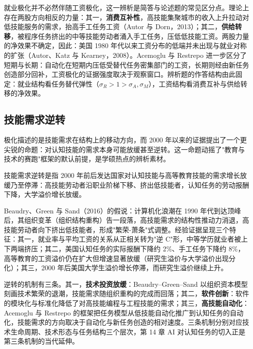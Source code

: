 就业极化并不必然伴随工资极化，这一辨析是简答与论述题的常见区分点。理论上存在两股方向相反的力量：其一，\textbf{消费互补性}，高技能集聚城市的收入上升拉动对低技能服务的需求，抬高手工任务工资（Autor 与 Dorn，2013）；其二，\textbf{供给转移}，被程序任务挤出的中等技能劳动者涌入手工任务，压低低技能工资。两股力量的净效果不确定，因此：美国 1980 年代以来工资分布的低端并未出现与就业对称的扩张（Autor、Katz 与 Kearney，2008）。Acemoglu 与 Restrepo 进一步区分了短期与长期：自动化在短期内压低受替代任务密集部门的工资，长期则经由新任务创造部分回补，工资极化的证据强度取决于观察窗口。辨析题的作答结构由此固定：就业结构看任务替代弹性（$\sigma_R > 1 > \sigma_A, \sigma_M$），工资结构看消费互补与供给转移的净效果。

\subsection{技能需求逆转}

极化描述的是技能需求在结构上的移动方向，而 2000 年以来的证据提出了一个更尖锐的命题：对认知技能的需求本身可能放缓甚至逆转。这一命题动摇了"教育与技术的赛跑"框架的默认前提，是学硕热点的辨析素材。

\begin{definition}
技能需求逆转是指 2000 年前后发达国家对认知技能与高等教育技能的需求增长放缓乃至停滞：高技能劳动者沿职业阶梯下移、挤出低技能者，认知任务的劳动报酬下降，大学溢价增长放缓。
\end{definition}

Beaudry、Green 与 Sand（2016）的假说：计算机化浪潮在 1990 年代到达顶峰后，其组织变革（组织结构重构）告一段落，高技能需求的结构性推动力消退，高技能劳动者向下挤出低技能者，形成"繁荣-萧条"式调整。经验证据呈现三个特征：其一，就业率与平均工资的关系从正相关转为"逆 C"形，中等学历就业者被上下两端挤压；其二，美国认知任务的实际报酬下降约 2\%、手工任务下降约 8\%，高等教育的工资溢价仍在扩大但增速显著放缓（研究生溢价与大学溢价出现分化）；其三，2000 年后美国大学生溢价增长停滞，而研究生溢价继续上升。

逆转的机制有三条。其一，\textbf{技术投资放缓}：Beaudry–Green–Sand 以组织资本模型刻画技术繁荣的退潮，技能需求随组织重构的完成而回落；其二，\textbf{软件创新}：软件的模块化与标准化降低了对高技能编程与工程技能的需求；其三，\textbf{高技能自动化}：Acemoglu 与 Restrepo 的框架把任务模型从低技能自动化推广到认知任务的自动化，技能需求的方向取决于自动化与新任务创造的相对速度。三条机制分别对应技术生命周期、技术形态与任务结构三个层次，第 14 章 AI 对认知任务的切入正是第三条机制的当代延伸。

